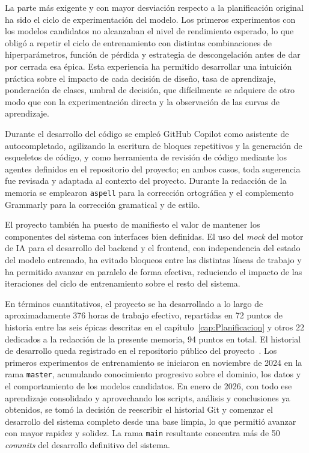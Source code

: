 La parte más exigente y con mayor desviación respecto a la planificación original ha sido el ciclo de experimentación del modelo. Los primeros experimentos con los modelos candidatos no alcanzaban el nivel de rendimiento esperado, lo que obligó a repetir el ciclo de entrenamiento con distintas combinaciones de hiperparámetros, función de pérdida y estrategia de descongelación antes de dar por cerrada esa épica. Esta experiencia ha permitido desarrollar una intuición práctica sobre el impacto de cada decisión de diseño, tasa de aprendizaje, ponderación de clases, umbral de decisión, que difícilmente se adquiere de otro modo que con la experimentación directa y la observación de las curvas de aprendizaje.

Durante el desarrollo del código se empleó GitHub Copilot como asistente de autocompletado, agilizando la escritura de bloques repetitivos y la generación de esqueletos de código, y como herramienta de revisión de código mediante los agentes definidos en el repositorio del proyecto; en ambos casos, toda sugerencia fue revisada y adaptada al contexto del proyecto. Durante la redacción de la memoria se emplearon \texttt{aspell} para la corrección ortográfica y el complemento Grammarly para la corrección gramatical y de estilo.

El proyecto también ha puesto de manifiesto el valor de mantener los componentes del sistema con interfaces bien definidas. El uso del \emph{mock} del motor de IA para el desarrollo del backend y el frontend, con independencia del estado del modelo entrenado, ha evitado bloqueos entre las distintas líneas de trabajo y ha permitido avanzar en paralelo de forma efectiva, reduciendo el impacto de las iteraciones del ciclo de entrenamiento sobre el resto del sistema.

En términos cuantitativos, el proyecto se ha desarrollado a lo largo de aproximadamente 376 horas de trabajo efectivo, repartidas en 72 puntos de historia entre las seis épicas descritas en el capítulo~\ref{cap:Planificacion} y otros 22 dedicados a la redacción de la presente memoria, 94 puntos en total. El historial de desarrollo queda registrado en el repositorio público del proyecto~\cite{cie10repo2026}. Los primeros experimentos de entrenamiento se iniciaron en noviembre de 2024 en la rama \texttt{master}, acumulando conocimiento progresivo sobre el dominio, los datos y el comportamiento de los modelos candidatos. En enero de 2026, con todo ese aprendizaje consolidado y aprovechando los scripts, análisis y conclusiones ya obtenidos, se tomó la decisión de reescribir el historial Git y comenzar el desarrollo del sistema completo desde una base limpia, lo que permitió avanzar con mayor rapidez y solidez. La rama \texttt{main} resultante concentra más de 50 \emph{commits} del desarrollo definitivo del sistema.
